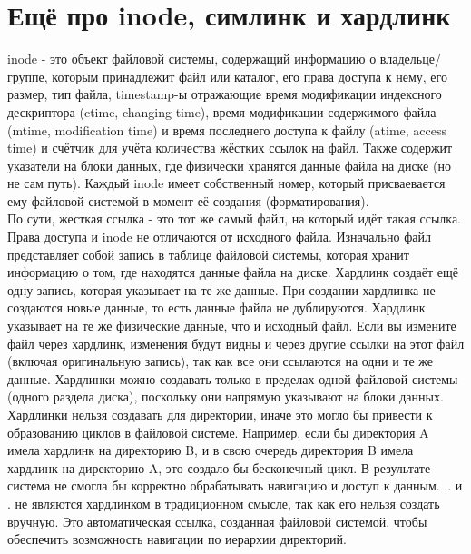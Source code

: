 \section{Ещё про inode, симлинк и хардлинк}
inode - это объект файловой системы, содержащий информацию о владельце/группе, которым принадлежит файл или каталог, его права доступа к нему, его размер, тип файла, timestamp-ы отражающие время модификации индексного дескриптора (ctime, changing time), время модификации содержимого файла (mtime, modification time) и время последнего доступа к файлу (atime, access time) и счётчик для учёта количества жёстких ссылок на файл. Также содержит указатели на блоки данных, где физически хранятся данные файла на диске (но не сам путь). Каждый inode имеет собственный номер, который присваевается ему файловой системой в момент её создания (форматирования). \\
По сути, жесткая ссылка - это тот же самый файл, на который идёт такая ссылка. Права доступа и inode не отличаются от исходного файла. Изначально файл представляет собой запись в таблице файловой системы, которая хранит информацию о том, где находятся данные файла на диске. Хардлинк создаёт ещё одну запись, которая указывает на те же данные. При создании хардлинка не создаются новые данные, то есть данные файла не дублируются. Хардлинк указывает на те же физические данные, что и исходный файл. Если вы измените файл через хардлинк, изменения будут видны и через другие ссылки на этот файл (включая оригинальную запись), так как все они ссылаются на одни и те же данные. Хардлинки можно создавать только в пределах одной файловой системы (одного раздела диска), поскольку они напрямую указывают на блоки данных. Хардлинки нельзя создавать для директории, иначе это могло бы привести к образованию циклов в файловой системе. Например, если бы директория A имела хардлинк на директорию B, и в свою очередь директория B имела хардлинк на директорию A, это создало бы бесконечный цикл. В результате система не смогла бы корректно обрабатывать навигацию и доступ к данным. .. и . не являются хардлинком в традиционном смысле, так как его нельзя создать вручную. Это автоматическая ссылка, созданная файловой системой, чтобы обеспечить возможность навигации по иерархии директорий.\\
